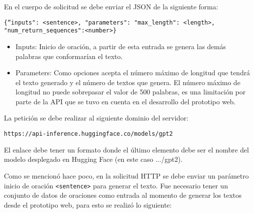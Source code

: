 \documentclass[../Main.tex]{subfiles}
\begin{document}
            \begin{justify}
            En el cuerpo de solicitud se debe enviar el JSON de la siguiente forma:
            
            \begin{center}
                \texttt{\{``inputs": <sentence>, "parameters": {"max\_length": <length>, "num\_return\_sequences":<number>\}}}
            \end{center}
            
            \begin{itemize}
                \item Inputs: Inicio de oración, a partir de esta entrada se genera las demás palabras que conformarían el texto.
                
                \item Parameters: Como opciones acepta el número máximo de longitud que tendrá el texto generado y el número de textos que genera.
                El número máximo de longitud no puede sobrepasar el valor de 500 palabras, es una limitación por parte de la API que se tuvo en cuenta en el desarrollo del prototipo web.
            \end{itemize}
            
            La petición se debe realizar al siguiente dominio del servidor:
            
            \begin{center}
                \texttt{https://api-inference.huggingface.co/models/gpt2}
            \end{center}
            
            El enlace debe tener un formato donde el último elemento debe ser el nombre del modelo desplegado en Hugging Face (en este caso .../gpt2).
            \end{justify}
            
            Como se mencionó hace poco, en la solicitud HTTP se debe enviar un parámetro inicio de oración \texttt{<sentence>} para generar el texto. Fue necesario tener un conjunto de datos de oraciones como entrada al momento de generar los textos desde el prototipo web, para esto se realizó lo siguiente:
            
\end{document}
